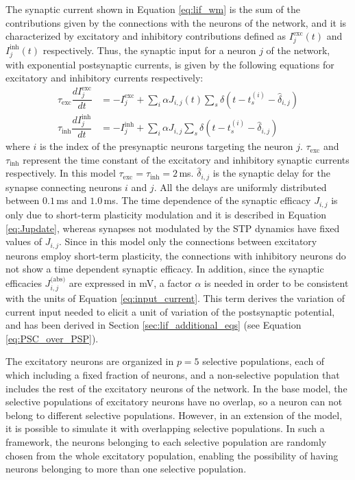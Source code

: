 \documentclass[a4paper, 12pt, twoside, openright]{book}
\begin{document}
The synaptic current shown in Equation \eqref{eq:lif_wm} is the sum of the contributions given by the connections with the neurons of the network, and it is characterized by excitatory and inhibitory contributions defined as $I_{j}^{\text{exc}}(t)$ and $I_{j}^{\text{inh}}(t)$ respectively.
Thus, the synaptic input for a neuron $j$ of the network, with exponential postsynaptic currents, is given by the following equations for excitatory and inhibitory currents respectively:
\begin{equation}
\begin{split}
    \tau_{\text{exc}}\dfrac{d I_{j}^{\text{exc}}}{dt} &= - I_{j}^{\text{exc}} + \sum_i \alpha J_{i,j}(t) \sum_s \delta (t-t_s ^{(i)}-\hat{\delta}_{i,j}) \\
    \tau_{\text{inh}}\dfrac{d I_{j}^{\text{inh}}}{dt} &= - I_{j}^{\text{inh}} + \sum_i \alpha J_{i,j} \sum_s \delta (t-t_s ^{(i)}-\hat{\delta}_{i,j})
    \label{eq:input_current}
\end{split}
\end{equation}
where $i$ is the index of the presynaptic neurons targeting the neuron $j$. $\tau_{\text{exc}}$ and $\tau_{\text{inh}}$ represent the time constant of the excitatory and inhibitory synaptic currents respectively. In this model $\tau_{\text{exc}}=\tau_{\text{inh}}=2$\,ms.
$\hat{\delta}_{i,j}$ is the synaptic delay for the synapse connecting neurons $i$ and $j$. All the delays are uniformly distributed between $0.1$\,ms and $1.0$\,ms.
The time dependence of the synaptic efficacy $J_{i,j}$ is only due to short-term plasticity modulation and it is described in Equation \eqref{eq:Jupdate}, whereas synapses not modulated by the STP dynamics have fixed values of $J_{i,j}$. Since in this model only the connections between excitatory neurons employ short-term plasticity, the connections with inhibitory neurons do not show a time dependent synaptic efficacy. In addition, since the synaptic efficacies $J^{\text{(abs)}}_{i,j}$ are expressed in mV, a factor $\alpha$ is needed in order to be consistent with the units of Equation \eqref{eq:input_current}. This term derives the variation of current input needed to elicit a unit of variation of the postsynaptic potential, and has been derived in Section \ref{sec:lif_additional_eqs} (see Equation \eqref{eq:PSC_over_PSP}).


The excitatory neurons are organized in $p=5$ selective populations, each of which including a fixed fraction of neurons, and a non-selective population that includes the rest of the excitatory neurons of the network. In the base model, the selective populations of excitatory neurons have no overlap, so a neuron can not belong to different selective populations. However, in an extension of the model, it is possible to simulate it with overlapping selective populations. In such a framework, the neurons belonging to each selective population are randomly chosen from the whole excitatory population, enabling the possibility of having neurons belonging to more than one selective population.
\end{document}
